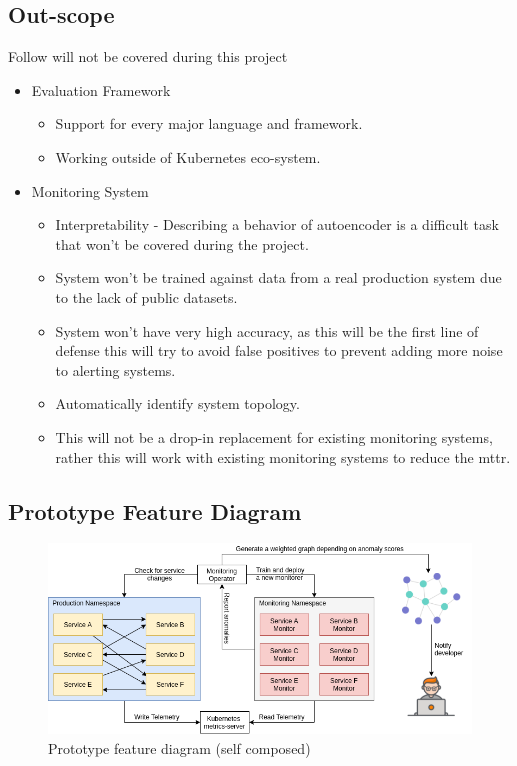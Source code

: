 \subsection{Out-scope} \label{sec:out-scope}
Follow will not be covered during this project
\begin{itemize}[noitemsep,nolistsep] 
    \item Evaluation Framework
    \begin{itemize}[noitemsep,nolistsep] 
        \item Support for every major language and framework.
        \item Working outside of Kubernetes eco-system.
    \end{itemize}
    \item Monitoring System
    \begin{itemize}[noitemsep,nolistsep] 
        \item Interpretability - Describing a behavior of autoencoder is a difficult task that won't be covered during the project.
        \item System won't be trained against data from a real production system due to the lack of public datasets.
        \item System won't have very high accuracy, as this will be the first line of defense this will try to avoid false positives to prevent adding more noise to alerting systems.
        \item Automatically identify system topology.
        \item This will not be a drop-in replacement for existing monitoring systems, rather this will work with existing monitoring systems to reduce the \ac{mttr}.
    \end{itemize}
\end{itemize}

\subsection{Prototype Feature Diagram}
\begin{figure}[H]
    \centering
    \includegraphics[width=16cm]{assets/introduction/High-level-system-diagram.png}
    \caption{Prototype feature diagram (self composed)}
    \label{fig:high-level-diagram}
\end{figure}
